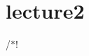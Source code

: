 \chapter{lecture2 }
\hypertarget{md_lecture-notes_2lecture2}{}\label{md_lecture-notes_2lecture2}
/\texorpdfstring{$\ast$}{*}! 